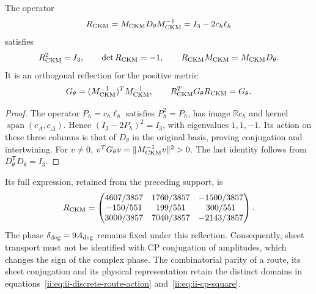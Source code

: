 \begin{theorem}
The operator
\begin{equation}
 \mathcal R_{\rm CKM}
 =\mathsf M_{\rm CKM}D_\theta\mathsf M_{\rm CKM}^{-1}
 =I_3-2c_h\ell_h
 \label{ii:eq:ii-ckm-reflection}
\end{equation}
satisfies
\begin{equation}
 \mathcal R_{\rm CKM}^2=I_3,\qquad
 \det\mathcal R_{\rm CKM}=-1,\qquad
 \mathcal R_{\rm CKM}\mathsf M_{\rm CKM}
 =\mathsf M_{\rm CKM}D_\theta.
 \label{ii:eq:ii-ckm-intertwining}
\end{equation}
It is an orthogonal reflection for the positive metric
\begin{equation}
 G_\theta=(\mathsf M_{\rm CKM}^{-1})^{\mathsf T}
                 \mathsf M_{\rm CKM}^{-1},\qquad
 \mathcal R_{\rm CKM}^{\mathsf T}G_\theta\mathcal R_{\rm CKM}=G_\theta.
 \label{ii:eq:ii-ckm-metric}
\end{equation}
\end{theorem}

\begin{proof}
The operator \(P_h=c_h\ell_h\) satisfies \(P_h^2=P_h\), has image \(\mathbb Rc_h\) and kernel \(\operatorname{span}(c_A,c_\Delta)\). Hence \((I_3-2P_h)^2=I_3\), with eigenvalues \(1,1,-1\). Its action on these three columns is that of \(D_\theta\) in the original basis, proving conjugation and intertwining. For \(v\ne0\), \(v^{\mathsf T}G_\theta v=\|\mathsf M_{\rm CKM}^{-1}v\|^2>0\). The last identity follows from \(D_\theta^{\mathsf T}D_\theta=I_3\).
\end{proof}

Its full expression, retained from the preceding support, is
\begin{equation}
 \mathcal R_{\rm CKM}=
 \begin{pmatrix}
 4607/3857&1760/3857&-1500/3857\\
 -150/551&199/551&300/551\\
 3000/3857&7040/3857&-2143/3857
 \end{pmatrix}.
 \label{ii:eq:ii-ckm-reflection-matrix}
\end{equation}
The phase \(\delta_{\rm deg}=9A_{\rm deg}\) remains fixed under this reflection. Consequently, sheet transport must not be identified with CP conjugation of amplitudes, which changes the sign of the complex phase. The combinatorial parity of a route, its sheet conjugation and its physical representation retain the distinct domains in equations~\eqref{ii:eq:ii-discrete-route-action} and~\eqref{ii:eq:ii-cp-square}.


